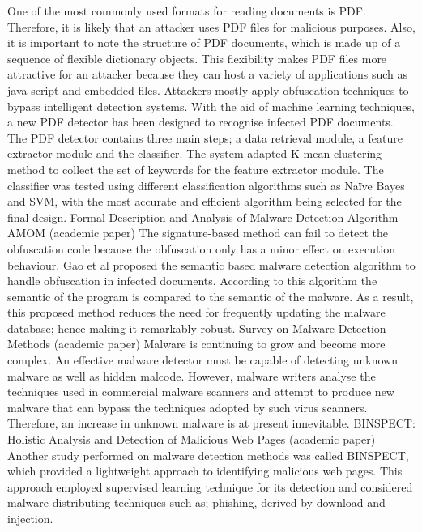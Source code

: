 One of the most commonly used formats for reading documents is PDF. Therefore, it is likely that an attacker uses PDF files for malicious purposes. Also, it is important to note the structure of PDF documents, which is made up of a sequence of flexible dictionary objects. This flexibility makes PDF files more attractive for an attacker because they can host a variety of applications such as java script and embedded files. Attackers mostly apply obfuscation techniques to bypass intelligent detection systems. With the aid of machine learning techniques, a new PDF detector has been designed to recognise infected PDF documents.
The PDF detector contains three main steps; a data retrieval module, a feature extractor module and the classifier. The system adapted K-mean clustering method to collect the set of keywords for the feature extractor module. The classifier was tested using different classification algorithms such as Naïve Bayes and SVM, with the most accurate and efficient algorithm being selected for the final design. 
Formal Description and Analysis of Malware Detection Algorithm AMOM (academic paper)
The signature-based method can fail to detect the obfuscation code because the obfuscation only has a minor effect on execution behaviour. Gao et al proposed the semantic based malware detection algorithm to handle obfuscation in infected documents. According to this algorithm the semantic of the program is compared to the semantic of the malware. As a result, this proposed method reduces the need for frequently updating the malware database; hence making it remarkably robust. 
Survey on Malware Detection Methods (academic paper)
Malware is continuing to grow and become more complex. An effective malware detector must be capable of detecting unknown malware as well as hidden malcode. However, malware writers analyse the techniques used in commercial malware scanners and attempt to produce new malware that can bypass the techniques adopted by such virus scanners. Therefore, an increase in unknown malware is at present innevitable.
BINSPECT: Holistic Analysis and Detection of Malicious Web Pages (academic paper)
Another study performed on malware detection methods was called BINSPECT, which provided a lightweight approach to identifying malicious web pages. This approach employed supervised learning technique for its detection and considered malware distributing techniques such as; phishing, derived-by-download and injection.

